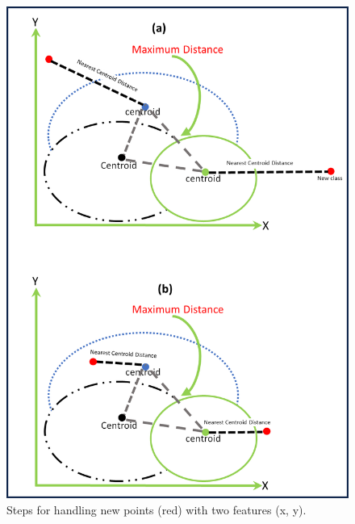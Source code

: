 \begin{figure}[H]
\begin{minipage}{0.48\textwidth}
        \includegraphics[width=\linewidth]{5_Emerging/images/scenario2.png}
        \caption{Steps for handling new points (red) with two features (x, y).}
        \label{fig:scenario2}
    \end{minipage}
\end{figure}
